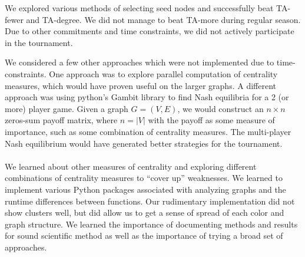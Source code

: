 \documentclass[letterpaper, 11pt]{article}
\begin{document}
We explored various methods of selecting seed nodes and successfully beat TA-fewer and TA-degree. We did not manage to beat TA-more during regular season. Due to other commitments and time constraints, we did not actively participate in the tournament.
\par
We considered a few other approaches which were not implemented due to time-constraints. One approach was to explore parallel computation of centrality measures, which would have proven useful on the larger graphs. A different approach was using python's Gambit library \cite{gambit} to find Nash equilibria for a 2 (or more) player game. Given a graph $G = (V,E)$, we would construct an $n \times n$ zeros-sum payoff matrix, where $n = |V|$ with the payoff as some measure of importance, such as some combination of centrality measures. The multi-player Nash equilibrium would have generated better strategies for the tournament.
\\\\
We learned about other measures of centrality and exploring different combinations of centrality measures to ``cover up'' weaknesses. We learned to implement various Python packages associated with analyzing graphs and the runtime differences between functions. Our rudimentary implementation did not show clusters well, but did allow us to get a sense of spread of each color and graph structure. We learned the importance of documenting methods and results for sound scientific method as well as the importance of trying a broad set of approaches.

\pagebreak
\end{document}
